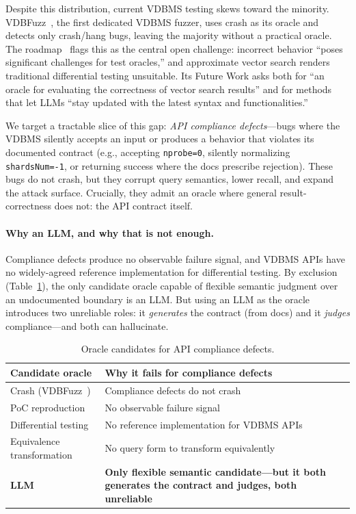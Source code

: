 \documentclass[sigconf, anonymous, review]{acmart}
\begin{document}
Despite this distribution, current VDBMS testing skews toward the minority. VDBFuzz~\cite{vdbfuzz26}, the first dedicated VDBMS fuzzer, uses crash as its oracle and detects only crash/hang bugs, leaving the majority without a practical oracle. The roadmap~\cite{roadmap25} flags this as the central open challenge: incorrect behavior ``poses significant challenges for test oracles,'' and approximate vector search renders traditional differential testing unsuitable. Its Future Work asks both for ``an oracle for evaluating the correctness of vector search results'' and for methods that let LLMs ``stay updated with the latest syntax and functionalities.''

We target a tractable slice of this gap: \emph{API compliance defects}---bugs where the VDBMS silently accepts an input or produces a behavior that violates its documented contract (e.g., accepting \texttt{nprobe=0}, silently normalizing \texttt{shardsNum=-1}, or returning success where the docs prescribe rejection). These bugs do not crash, but they corrupt query semantics, lower recall, and expand the attack surface. Crucially, they admit an oracle where general result-correctness does not: the API contract itself.

\paragraph{Why an LLM, and why that is not enough.}
Compliance defects produce no observable failure signal, and VDBMS APIs have no widely-agreed reference implementation for differential testing. By exclusion (Table~\ref{tab:exclusion}), the only candidate oracle capable of flexible semantic judgment over an undocumented boundary is an LLM. But using an LLM as the oracle introduces two unreliable roles: it \emph{generates} the contract (from docs) and it \emph{judges} compliance---and both can hallucinate.

\begin{table}[t]
\caption{Oracle candidates for API compliance defects.}
\label{tab:exclusion}
\small
\begin{tabular}{@{}p{}p{}@{}}
\toprule
Candidate oracle & Why it fails for compliance defects \\
\midrule
Crash (VDBFuzz~\cite{vdbfuzz26}) & Compliance defects do not crash \\
PoC reproduction & No observable failure signal \\
Differential testing & No reference implementation for VDBMS APIs \\
Equivalence transformation & No query form to transform equivalently \\
\textbf{LLM} & \textbf{Only flexible semantic candidate---but it both generates the contract and judges, both unreliable} \\
\bottomrule
\end{tabular}
\end{table}
\end{document}
